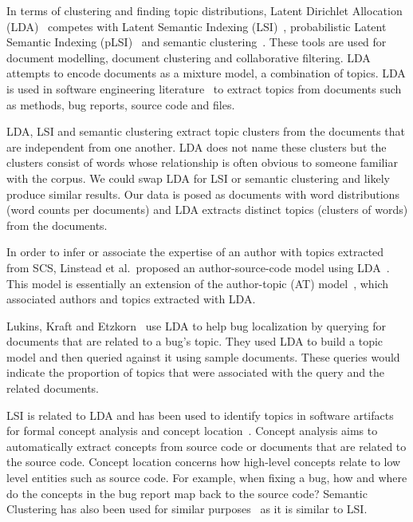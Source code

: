 \documentclass[times, 10pt,twocolumn]{article}
\newcommand{\shrinkit}{\vspace*{-.3em}}
\begin{document}

In terms of clustering and finding topic distributions, Latent
Dirichlet Allocation (LDA)~\cite{944937} competes with Latent Semantic
Indexing
(LSI)~\cite{1374321,10.1109/ICPC.2007.13},
probabilistic Latent Semantic Indexing (pLSI)~\cite{944937} and
semantic clustering~\cite{1698774,1566153}. These tools are used for
document modelling, document clustering and collaborative
filtering. LDA attempts to encode documents as a mixture
model, a combination of topics.  LDA is used in software engineering
literature~\cite{lukins2008,10.1109/MSR.2007.20}%
 to extract topics from documents such as methods, bug
reports, source code and files.

LDA, LSI and semantic clustering extract topic
clusters from the documents that are independent from one another. LDA
does not name these clusters but the clusters consist of words whose
relationship is often obvious to someone familiar with the corpus. We
could swap LDA for LSI or semantic clustering and likely produce similar
results. Our data is posed as documents with word distributions (word
counts per documents) and LDA extracts distinct topics (clusters of
words) from the documents.

\shrinkit
{}
\shrinkit




In order to infer or associate the expertise of an author with topics
extracted from SCS, Linstead et al.\  proposed an author-source-code model
using LDA~\cite{10.1109/MSR.2007.20}.%
This model
is essentially an extension of the author-topic (AT)
model~\cite{1036902}, which associated authors and topics extracted
with LDA.

Lukins, Kraft and Etzkorn~\cite{lukins2008} use LDA to help bug
localization by querying for documents that are related to a bug's topic. They
used LDA to build a topic model and then queried against it using
sample documents. These queries would indicate the proportion of
topics that were associated with the query and the
related documents.

LSI is related to LDA and has been used to identify topics in software
artifacts for formal concept analysis and concept
location~\cite{1374321,10.1109/ICPC.2007.13}.
Concept analysis aims to automatically extract concepts from source
code or documents that are related to the source code.  Concept location concerns how
high-level concepts relate to low level entities such as source code. For
example, when fixing a bug, how and where do the concepts in the bug
report map back to the source code?  Semantic Clustering has also been
used for similar purposes~\cite{1698774,1566153} as it is similar to
LSI.
\end{document}
